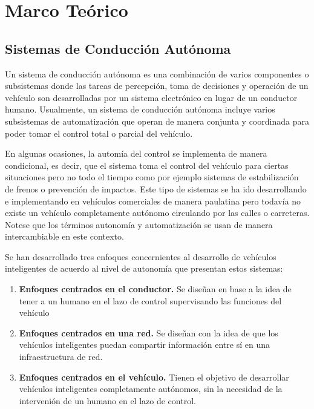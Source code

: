 \chapter{Marco Teórico} \label{ch:m_teorico}

\section{Sistemas de Conducción Autónoma}
Un sistema de conducción autónoma es una combinación de varios componentes o subsistemas donde las tareas 
de percepción, toma de decisiones y operación de un vehículo son desarrolladas por un sistema electrónico en lugar
de un conductor humano. Usualmente, un sistema de conducción autónoma incluye varios subsistemas de automatización 
que operan de manera conjunta y coordinada para poder tomar el control total o parcial del vehículo. 

En algunas ocasiones, la automía del control se implementa de manera condicional, es decir, que el sistema toma 
el control del vehículo para ciertas situaciones pero no todo el tiempo como por ejemplo sistemas de estabilización 
de frenos o prevención de impactos. Este tipo de sistemas se ha ido desarrollando e implementando en vehículos comerciales 
de manera paulatina pero todavía no existe un vehículo completamente autónomo circulando por las calles o carreteras. Notese
que los términos autonomía y automatización se usan de manera intercambiable en este contexto.

Se han desarrollado tres enfoques concernientes al desarrollo de vehículos inteligentes de acuerdo al nivel de autonomía 
que presentan estos sistemas:

\begin{enumerate}
    \item \textbf{Enfoques centrados en el conductor.} Se diseñan en base a la idea de tener a un humano en el lazo de control 
    supervisando las funciones del vehículo
    \item \textbf{Enfoques centrados en una red.} Se diseñan con la idea de que los vehículos inteligentes puedan compartir información entre sí en una infraestructura de red.
    \item \textbf{Enfoques centrados en el vehículo.} Tienen el objetivo de desarrollar vehículos inteligentes completamente autónomos, sin la necesidad de la intervenión de un humano en el lazo de control.
\end{enumerate}

